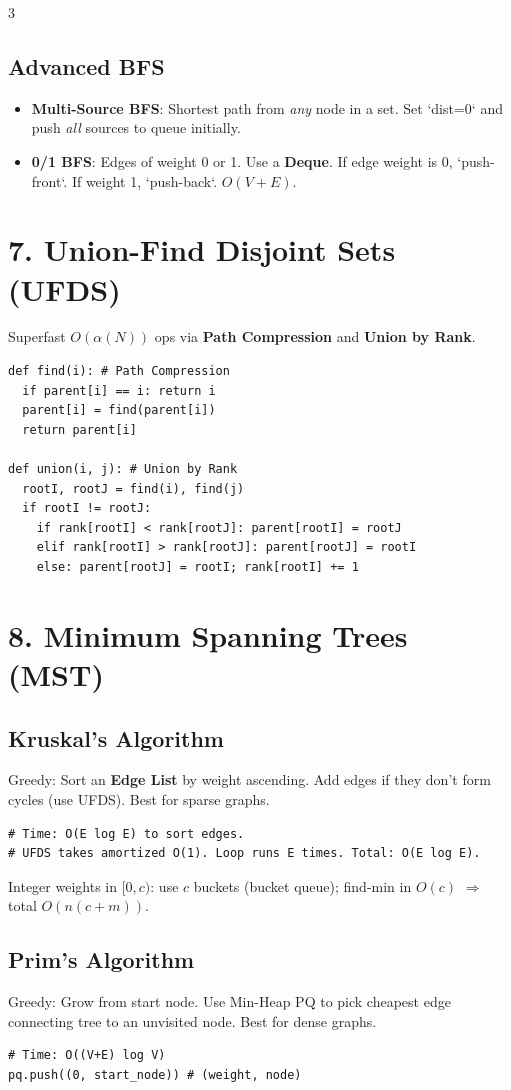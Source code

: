 \documentclass[7pt,landscape]{extarticle}
\begin{document}
\begin{multicols*}{3}
\subsection*{Advanced BFS}
\begin{itemize}
    \item \textbf{Multi-Source BFS}: Shortest path from \textit{any} node in a set. Set `dist=0` and push \textit{all} sources to queue initially.
    \item \textbf{0/1 BFS}: Edges of weight 0 or 1. Use a \textbf{Deque}. If edge weight is 0, `push-front`. If weight 1, `push-back`. $O(V+E)$.
\end{itemize}

\section*{7. Union-Find Disjoint Sets (UFDS)}
Superfast $O(\alpha(N))$ ops via \textbf{Path Compression} and \textbf{Union by Rank}.
\begin{lstlisting}
def find(i): # Path Compression
  if parent[i] == i: return i
  parent[i] = find(parent[i])
  return parent[i]

def union(i, j): # Union by Rank
  rootI, rootJ = find(i), find(j)
  if rootI != rootJ:
    if rank[rootI] < rank[rootJ]: parent[rootI] = rootJ
    elif rank[rootI] > rank[rootJ]: parent[rootJ] = rootI
    else: parent[rootJ] = rootI; rank[rootI] += 1
\end{lstlisting}

\section*{8. Minimum Spanning Trees (MST)}
\subsection*{Kruskal's Algorithm}
Greedy: Sort an \textbf{Edge List} by weight ascending. Add edges if they don't form cycles (use UFDS). Best for sparse graphs.
\begin{lstlisting}
# Time: O(E log E) to sort edges.
# UFDS takes amortized O(1). Loop runs E times. Total: O(E log E).
\end{lstlisting}
Integer weights in $[0,c)$: use $c$ buckets (bucket queue); find-min in $O(c)$ $\Rightarrow$ total $O(n(c+m))$.

\subsection*{Prim's Algorithm}
Greedy: Grow from start node. Use Min-Heap PQ to pick cheapest edge connecting tree to an unvisited node. Best for dense graphs.
\begin{lstlisting}
# Time: O((V+E) log V)
pq.push((0, start_node)) # (weight, node)


\end{lstlisting}
\end{multicols*}
\end{document}
